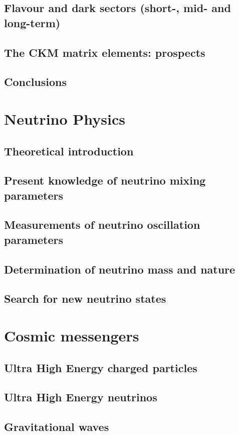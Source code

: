 \documentclass[../report.tex]{subfiles}
\begin{document}
\section{Flavour and dark sectors (short-, mid- and long-term)}
\section{The CKM matrix elements: prospects}
\section{Conclusions}

\chapter{Neutrino Physics}
\section{Theoretical introduction}
\section{Present knowledge of neutrino mixing parameters}
\section{Measurements of neutrino oscillation parameters}
\section{Determination of neutrino mass and nature}
\section{Search for new neutrino states}

\chapter{Cosmic messengers}
\section{Ultra High Energy charged particles}
\section{Ultra High Energy neutrinos}
\section{Gravitational waves}
\end{document}
